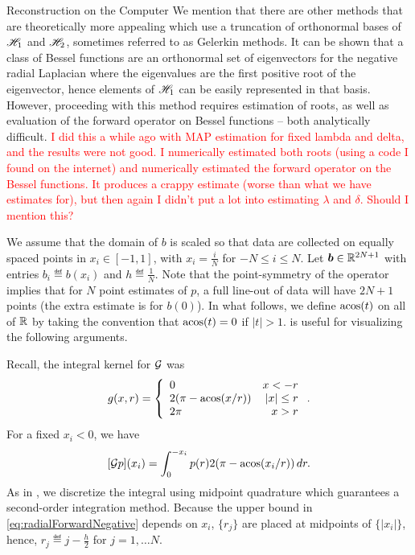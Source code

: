 \begin{chapter}{Reconstruction on the Computer}
We mention that there are other methods that are theoretically more appealing which use a truncation of orthonormal bases of $\mathscr H _1$ and $\mathscr H_2$, sometimes referred to as Gelerkin methods.
It can be shown that a class of Bessel functions are an orthonormal set of eigenvectors for the negative radial Laplacian where the eigenvalues are the first positive root of the eigenvector, hence elements of $\mathscr H_1$ can be easily represented in that basis.
However, proceeding with this method requires estimation of roots, as well as evaluation of the forward operator on Bessel functions -- both analytically difficult.
\textcolor{red}{
  I did this a while ago with MAP estimation for fixed lambda and delta, and the results were not good. I numerically estimated both roots (using a code I found on the internet) and numerically estimated the forward operator on the Bessel functions.
  It produces a crappy estimate (worse than what we have estimates for), but then again I didn't put a lot into estimating $\lambda$ and $\delta$.
  Should I mention this?
}


We assume that the domain of $b$ is scaled so that data are collected on equally spaced points in $x_i \in [-1,1]$, with $x_i = \frac iN$ for $-N\le i\le N$.
Let $\mbox{\boldmath$b$} \in \mathbb R^{2N + 1}$ with entries $b_i \eqdef b(x_i)$ and $h\eqdef \frac 1N$. 
Note that the point-symmetry of the operator implies that for $N$ point estimates of $p$, a full line-out of data will have $2N + 1$ points (the extra estimate is for $b(0)$).
In what follows, we define $\operatorname*{acos}(t)$ on all of $\mathbb R$ by taking the convention that $\operatorname*{acos}(t) = 0$ if $|t| > 1$.
 is useful for visualizing the following arguments.

Recall, the integral kernel for $\mathcal G$ was
\begin{equation} 
  g(x,r) = \left\{\begin{array}{lr}
    0 & x < - r\\
    2(\pi - \operatorname*{acos}(x/r)) & |x| \le r\\
    2\pi &  x> r
  \end{array}\right..  
\end{equation}
For a fixed  $x_i<0$, we have
\begin{equation} \label{eq:radialForwardNegative}
  [\mathcal G p](x_i) = \int_0^{-x_i} p(r)2(\pi - \operatorname*{acos}(x_i/r))\,dr.
\end{equation}
As in \citep{bardsley2012mcmc}, we discretize the integral using midpoint quadrature which guarantees a second-order integration method.
Because the upper bound in \eqref{eq:radialForwardNegative} depends on $x_i$, $\{r_j\}$ are placed at midpoints of $\{|x_i|\}$, hence, $r_j \eqdef j-\frac h2$ for $j=1,\dots N$. 


\end{chapter}
